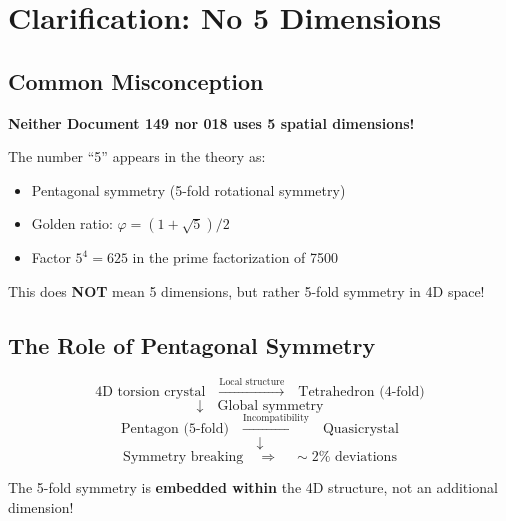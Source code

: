 {	\section{Clarification: No 5 Dimensions}
	
	\subsection{Common Misconception}
	
	\begin{warning}
		\textbf{Neither Document 149 nor 018 uses 5 spatial dimensions!}
		
		The number \enquote{5} appears in the theory as:
		\begin{itemize}
			\item Pentagonal symmetry (5-fold rotational symmetry)
			\item Golden ratio: $\varphi = (1+\sqrt{5})/2$
			\item Factor $5^4 = 625$ in the prime factorization of 7500
		\end{itemize}
		
		This does \textbf{NOT} mean 5 dimensions, but rather 5-fold symmetry in 4D space!
	\end{warning}
	
	\subsection{The Role of Pentagonal Symmetry}
	
	\begin{equation}
		\text{4D torsion crystal} \quad \xrightarrow{\text{Local structure}} \quad \text{Tetrahedron (4-fold)}
	\end{equation}
	\begin{equation}
		\downarrow \quad \text{Global symmetry}
	\end{equation}
	\begin{equation}
		\text{Pentagon (5-fold)} \quad \xrightarrow{\text{Incompatibility}} \quad \text{Quasicrystal}
	\end{equation}
	\begin{equation}
		\downarrow
	\end{equation}
	\begin{equation}
		\text{Symmetry breaking} \quad \Rightarrow \quad \sim 2\% \text{ deviations}
	\end{equation}
	
	The 5-fold symmetry is \textbf{embedded within} the 4D structure, not an additional dimension!
	
}
